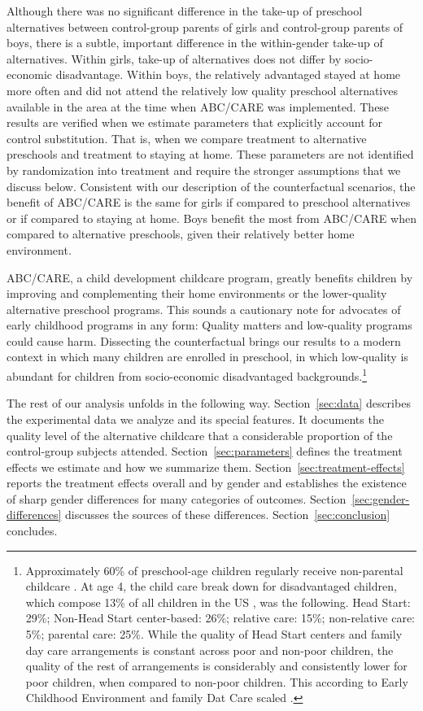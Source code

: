 Although there was no significant difference in the take-up of preschool alternatives between control-group parents of girls and control-group parents of boys, there is a subtle, important difference in the within-gender take-up of alternatives. Within girls, take-up of alternatives does not differ by socio-economic disadvantage. Within boys, the relatively advantaged stayed at home more often and did not attend the relatively low quality preschool alternatives available in the area at the time when ABC/CARE was implemented. These results are verified when we estimate parameters that explicitly account for control substitution. That is, when we compare treatment to alternative preschools and treatment to staying at home. These parameters are not identified by randomization into treatment and require the stronger assumptions that we discuss below. Consistent with our description of the counterfactual scenarios, the benefit of ABC/CARE is the same for girls if compared to preschool alternatives or if compared to staying at home. Boys benefit the most from ABC/CARE when compared to alternative preschools, given their relatively better home environment.

ABC/CARE, a child development childcare program, greatly benefits children by improving and complementing their home environments or the lower-quality alternative preschool programs. This sounds a cautionary note for advocates of early childhood programs in any form: Quality matters and low-quality programs could cause harm. Dissecting the counterfactual brings our results to a modern context in which many children are enrolled in preschool, in which low-quality is abundant for children from socio-economic disadvantaged backgrounds.\footnote{Approximately 60\% of preschool-age children regularly receive non-parental childcare \citep{FIFCFS_2009_Wellbeing_REPORT}. At age 4, the child care break down for disadvantaged children, which compose 13\% of all children in the US \citep{USCB_2014_CoverageReport}, was the following. Head Start: 29\%; Non-Head Start center-based: 26\%; relative care: 15\%; non-relative care: 5\%; parental care: 25\%. While the quality of Head Start centers and family day care arrangements is constant across poor and non-poor children, the quality of the rest of arrangements is considerably and consistently lower for poor children, when compared to non-poor children. This according to Early Childhood Environment and family Dat Care scaled \citep{FIFCFS_2009_Wellbeing_REPORT}.}

The rest of our analysis unfolds in the following way. Section~\ref{sec:data} describes the experimental data we analyze and its special features. It documents the quality level of the alternative childcare that a considerable proportion of the control-group subjects attended. Section~\ref{sec:parameters} defines the treatment effects we estimate and how we summarize them. Section~\ref{sec:treatment-effects} reports the treatment effects overall and by gender and establishes the existence of sharp gender differences for many categories of outcomes. Section~\ref{sec:gender-differences} discusses the sources of these differences. Section~\ref{sec:conclusion} concludes.
